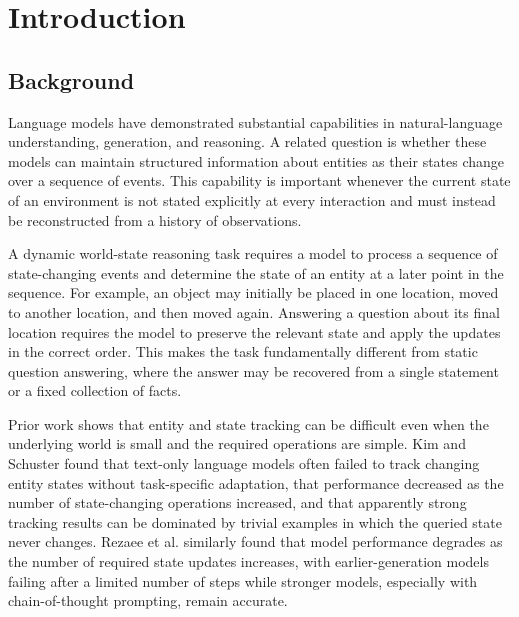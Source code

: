 \documentclass{iutbscthesis}
\begin{document}
\chapter{Introduction}
\section{Background}
Language models have demonstrated substantial capabilities in natural-language understanding,
generation, and reasoning. A related question is whether these models can maintain structured
information about entities as their states change over a sequence of events. This capability is
important whenever the current state of an environment is not stated explicitly at every interaction
and must instead be reconstructed from a history of observations.

A dynamic world-state reasoning task requires a model to process a sequence of state-changing
events and determine the state of an entity at a later point in the sequence. For example, an object
may initially be placed in one location, moved to another location, and then moved again. Answering
a question about its final location requires the model to preserve the relevant state and apply the
updates in the correct order. This makes the task fundamentally different from static question
answering, where the answer may be recovered from a single statement or a fixed collection of facts.

Prior work shows that entity and state tracking can be difficult even when the underlying world is
small and the required operations are simple. Kim and Schuster \cite{kim2023entity} found that
text-only language models often failed to track changing entity states without task-specific
adaptation, that performance decreased as the number of state-changing operations increased, and
that apparently strong tracking results can be dominated by trivial examples in which the queried
state never changes. Rezaee et al. \cite{rezaee2025exploring} similarly found that model performance
degrades as the number of required state updates increases, with earlier-generation models failing
after a limited number of steps while stronger models, especially with chain-of-thought prompting,
remain accurate.
\end{document}
